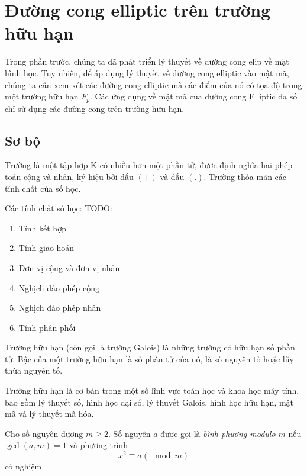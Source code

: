 \section{Đường cong elliptic trên trường hữu hạn}

Trong phần trước, chúng ta đã phát triển lý thuyết về đường cong elip về mặt hình học.
Tuy nhiên, để áp dụng lý thuyết về đường cong elliptic vào mật mã,
chúng ta cần xem xét các đường cong elliptic mà các điểm của nó có tọa độ trong một trường hữu hạn $F_p$.
Các ứng dụng về mật mã của đường cong Elliptic đa số chỉ sử dụng các đường
cong trên trường hữu hạn.

\subsection{Sơ bộ}
\begin{definition}
	Trường là một tập hợp K có nhiều hơn một phần tử, được định nghĩa hai phép toán cộng và nhân,
	ký hiệu bởi dấu $(+)$ và dấu $(.)$. Trường thỏa mãn các tính chất của số học.
\end{definition}
Các tính chất số học:
TODO:
\begin{enumerate}
	\item Tính kết hợp
	\item Tính giao hoán
	\item Đơn vị cộng và đơn vị nhân
	\item Nghịch đảo phép cộng
	\item Nghịch đảo phép nhân
	\item Tính phân phối
\end{enumerate}

\begin{definition}
	Trường hữu hạn (còn gọi là trường Galois) là những trường có hữu hạn số phần tử.
	Bậc của một trường hữu hạn là số phần tử của nó, là số nguyên tố hoặc lũy thừa nguyên tố.
\end{definition}
Trường hữu hạn là cơ bản trong một số lĩnh vực toán học và khoa học máy tính,
bao gồm lý thuyết số, hình học đại số, lý thuyết Galois, hình học hữu hạn, mật mã và lý thuyết mã hóa.

\begin{definition}
	Cho số nguyên dương $m \geq 2$. Số nguyên $a$ được gọi là \textit{bình phương modulo $m$} nếu $\gcd(a,m) = 1$ và phương trình
	$$x^2 \equiv a (\mod{m})$$
	có nghiệm
\end{definition}

